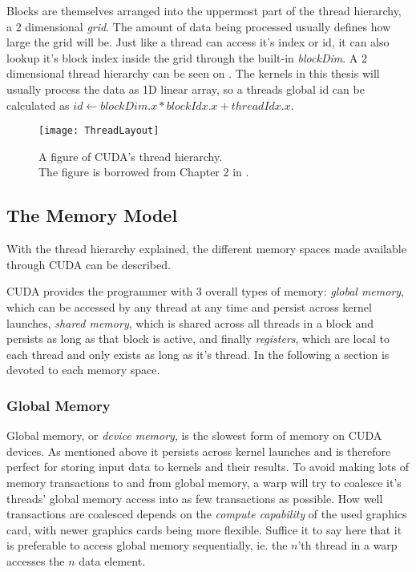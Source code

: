 
Blocks are themselves arranged into the uppermost part of the thread
hierarchy, a 2 dimensional \textit{grid}. The amount of data being
processed usually defines how large the grid will be. Just like a
thread can access it's index or id, it can also lookup it's block
index inside the grid through the built-in \textit{blockDim}. A 2
dimensional thread hierarchy can be seen on
. The kernels in this thesis will usually
process the data as 1D linear array, so a threads global id can be
calculated as $id \leftarrow blockDim.x * blockIdx.x + threadIdx.x$.

\begin{figure}
  \centering
  \texttt{[image: ThreadLayout]}
  \caption[CUDA's thread hierarchy.]{A figure of CUDA's thread
    hierarchy.\\ The figure is borrowed from Chapter 2 in
    .}
  \label{fig:threadLayout}
\end{figure}




\subsection{The Memory Model}

With the thread hierarchy explained, the different memory spaces made
available through CUDA can be described.  

CUDA provides the programmer with 3 overall types of memory:
\textit{global memory}, which can be accessed by any thread at any
time and persist across kernel launches, \textit{shared memory}, which
is shared across all threads in a block and persists as long as that
block is active, and finally \textit{registers}, which are local to
each thread and only exists as long as it's thread. In the following a
section is devoted to each memory space.

\subsubsection{Global Memory}


Global memory, or \textit{device memory}, is the slowest form of
memory on CUDA devices. As mentioned above it persists across kernel
launches and is therefore perfect for storing input data to kernels
and their results. To avoid making lots of memory transactions to and
from global memory, a warp will try to coalesce it's threads' global
memory access into as few transactions as possible. How well
transactions are coalesced depends on the \textit{compute capability}
of the used graphics card, with newer graphics cards being more
flexible. Suffice it to say here that it is preferable to access
global memory sequentially, ie. the $n$'th thread in a warp accesses
the $n$ data element.

